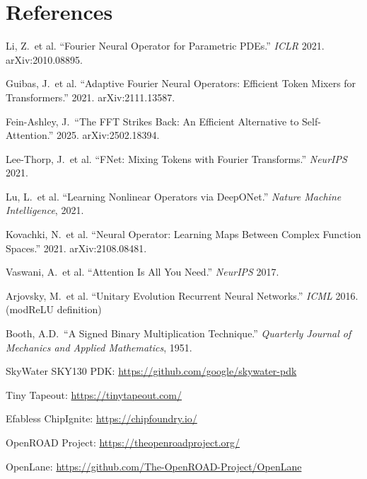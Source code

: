 \documentclass[11pt,a4paper]{article}
\theoremstyle{definition}
\theoremstyle{remark}
\begin{document}
\section*{References}


\begin{enumerate}[label={[\arabic*]}]
  \item Li, Z.\ et al. ``Fourier Neural Operator for Parametric PDEs.''
    \emph{ICLR} 2021. arXiv:2010.08895.
  \item Guibas, J.\ et al. ``Adaptive Fourier Neural Operators: Efficient
    Token Mixers for Transformers.'' 2021. arXiv:2111.13587.
  \item Fein-Ashley, J.\ ``The FFT Strikes Back: An Efficient Alternative to
    Self-Attention.'' 2025. arXiv:2502.18394.
  \item Lee-Thorp, J.\ et al. ``FNet: Mixing Tokens with Fourier Transforms.''
    \emph{NeurIPS} 2021.
  \item Lu, L.\ et al. ``Learning Nonlinear Operators via DeepONet.''
    \emph{Nature Machine Intelligence}, 2021.
  \item Kovachki, N.\ et al. ``Neural Operator: Learning Maps Between
    Complex Function Spaces.'' 2021. arXiv:2108.08481.
  \item Vaswani, A.\ et al. ``Attention Is All You Need.''
    \emph{NeurIPS} 2017.
  \item Arjovsky, M.\ et al. ``Unitary Evolution Recurrent Neural Networks.''
    \emph{ICML} 2016. (modReLU definition)
  \item Booth, A.D.\ ``A Signed Binary Multiplication Technique.''
    \emph{Quarterly Journal of Mechanics and Applied Mathematics}, 1951.
  \item SkyWater SKY130 PDK: \url{https://github.com/google/skywater-pdk}
  \item Tiny Tapeout: \url{https://tinytapeout.com/}
  \item Efabless ChipIgnite: \url{https://chipfoundry.io/}
  \item OpenROAD Project: \url{https://theopenroadproject.org/}
  \item OpenLane: \url{https://github.com/The-OpenROAD-Project/OpenLane}
\end{enumerate}
\end{document}
